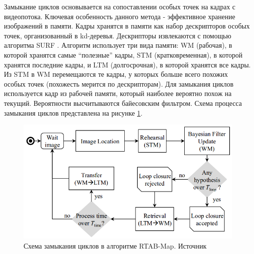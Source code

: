 \documentclass{mipt-thesis-ms}
\begin{document}
	Замыкание циклов основывается на сопоставлении особых точек на кадрах с видеопотока. Ключевая особенность данного метода - эффективное хранение изображений в памяти. Кадры хранятся в памяти как набор дескрипторов особых точек, организованный в kd-деревья. Дескрипторы извлекаются с помощью алгоритма SURF \cite{bay2006surf}. Алгоритм использует три вида памяти: WM (рабочая), в которой хранятся самые “полезные” кадры, STM (кратковременная), в которой хранятся последние кадры, и LTM (долгосрочная), в которой хранятся все кадры. Из STM в WM перемещаются те кадры, у которых больше всего похожих особых точек (похожесть мерится по дескрипторам). Для замыкания циклов используется кадр из рабочей памяти, который наиболее вероятно похож на текущий. Вероятности высчитываются байесовским фильтром. Схема процесса замыкания циклов представлена на рисунке \ref{figureloopclosing}.
	
	\begin{figure}
		\centering
		\includegraphics[scale=0.5]{img/rtabmap_loopclosure.png}
		\caption{Схема замыкания циклов в алгоритме RTAB-Map. Источник \cite{labbe2011memory}}
		\label{figureloopclosing}
	\end{figure}
	
\end{document}
